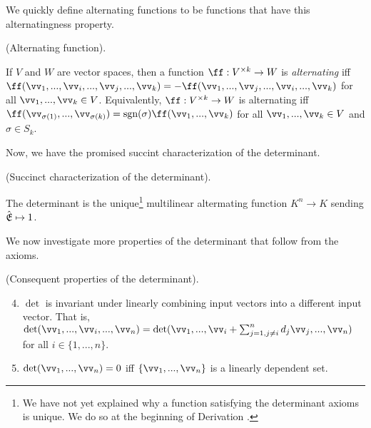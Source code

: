 We quickly define alternating functions to be functions that have this alternatingness property.

\begin{defn}
    (Alternating function).

    If $V$ and $W$ are vector spaces, then a function $\ff:V^{\times k} \rightarrow W$ is \textit{alternating} iff \\ ${\ff(\vv_1, ..., \vv_i, ..., \vv_j, ..., \vv_k) = -\ff(\vv_1, ..., \vv_j, ..., \vv_i, ..., \vv_k)}$ for all $\vv_1, ..., \vv_k \in V$. Equivalently, $\ff:V^{\times k} \rightarrow W$ is alternating iff
    ${\ff(\vv_{\sigma(1)}, ..., \vv_{\sigma(k)}) = \sgn(\sigma) \ff(\vv_1, ..., \vv_k)}$ for all $\vv_1, ..., \vv_k \in V$ and $\sigma \in S_k$.
\end{defn}

Now, we have the promised succint characterization of the determinant.

\begin{theorem}
    (Succinct characterization of the determinant).

    The determinant is the unique\footnote{We have not yet explained why a function satisfying the determinant axioms is unique. We do so at the beginning of Derivation \label{ch::lin_alg::deriv::permutation_formula_for_determinant}.} multilinear altermating function $K^n \rightarrow K$ sending ${\hat{\mathfrak{E}}} \mapsto 1$.
\end{theorem}

We now investigate more properties of the determinant that follow from the axioms.

\begin{theorem}
\label{ch::lin_alg::thm::consequent_det_props}
    (Consequent properties of the determinant). 
    
    \begin{enumerate}
    \setcounter{enumi}{3}
        \item $\det$ is invariant under linearly combining input vectors into a different input vector. That is, $\det(\vv_1, ..., \vv_i, ..., \vv_n) = \det(\vv_1, ..., \vv_i + \sum_{j = 1, j \neq i}^n d_j \vv_j, ..., \vv_n)$ for all $i \in \{1, ..., n\}$.
        \item $\det(\vv_1, ..., \vv_n) = 0$ iff $\{\vv_1, ..., \vv_n\}$ is a linearly dependent set.
    \end{enumerate}
\end{theorem}

